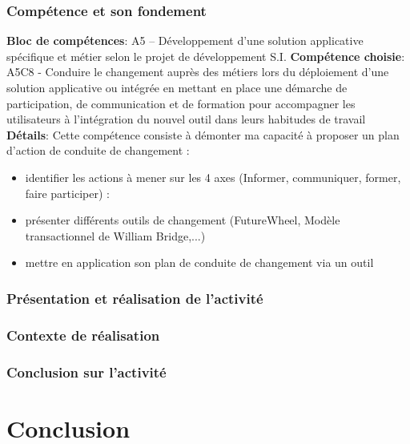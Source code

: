 \documentclass[a4paper, 11pt]{report}
\begin{document}
\subsection{Compétence et son fondement}
\textbf{Bloc de compétences}: A5 – Développement d’une solution applicative spécifique et métier selon le projet de développement S.I.
\newline
\textbf{Compétence choisie}: A5C8 - Conduire le changement auprès des métiers lors du déploiement d’une solution applicative ou intégrée en mettant en place une démarche de participation, de communication et de formation pour accompagner les utilisateurs à l’intégration du nouvel outil dans leurs habitudes de travail
\newline
\textbf{Détails}: Cette compétence consiste à démonter ma capacité à proposer un plan d’action de conduite de changement :
\begin{itemize}
  \item identifier les actions à mener sur les 4 axes (Informer, communiquer, former, faire participer) :
  \item présenter différents outils de changement (FutureWheel, Modèle transactionnel de William Bridge,...)
  \item mettre en application son plan de conduite de changement via un outil
\end{itemize}
\subsection{Présentation et réalisation de l'activité}
\subsection{Contexte de réalisation}
\subsection{Conclusion sur l'activité}

\chapter{Conclusion}
\end{document}
